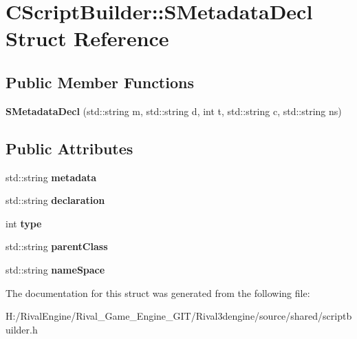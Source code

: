 \hypertarget{struct_c_script_builder_1_1_s_metadata_decl}{}\section{C\+Script\+Builder\+:\+:S\+Metadata\+Decl Struct Reference}
\label{struct_c_script_builder_1_1_s_metadata_decl}
\subsection*{Public Member Functions}
\begin{DoxyCompactItemize}
\item 
\mbox{\label{struct_c_script_builder_1_1_s_metadata_decl_a87bb3d64c45bf527c6ae80f09bfb026b}} 
{\bfseries S\+Metadata\+Decl} (std\+::string m, std\+::string d, int t, std\+::string c, std\+::string ns)
\end{DoxyCompactItemize}
\subsection*{Public Attributes}
\begin{DoxyCompactItemize}
\item 
\mbox{\label{struct_c_script_builder_1_1_s_metadata_decl_ae23020ae4ffefcd7601865309e3bcefc}} 
std\+::string {\bfseries metadata}
\item 
\mbox{\label{struct_c_script_builder_1_1_s_metadata_decl_a6705f0458ee30bdb96aae748f3dd184c}} 
std\+::string {\bfseries declaration}
\item 
\mbox{\label{struct_c_script_builder_1_1_s_metadata_decl_ac99fd2b84dcb554a9dc84027812825db}} 
int {\bfseries type}
\item 
\mbox{\label{struct_c_script_builder_1_1_s_metadata_decl_acd03867c2cfc853143d983532b1d2264}} 
std\+::string {\bfseries parent\+Class}
\item 
\mbox{\label{struct_c_script_builder_1_1_s_metadata_decl_a4997917116f4d04e8083a1546ecdce47}} 
std\+::string {\bfseries name\+Space}
\end{DoxyCompactItemize}


The documentation for this struct was generated from the following file\+:\begin{DoxyCompactItemize}
\item 
H\+:/\+Rival\+Engine/\+Rival\+\_\+\+Game\+\_\+\+Engine\+\_\+\+G\+I\+T/\+Rival3dengine/source/shared/scriptbuilder.\+h\end{DoxyCompactItemize}
